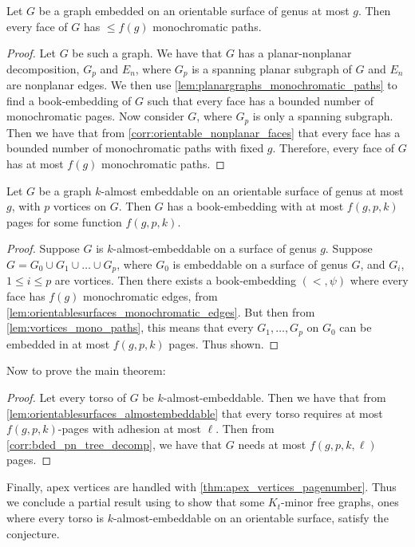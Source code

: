 \begin{lemma}\label{lem:orientablesurfaces_monochromatic_edges}
	Let $G$ be a graph embedded on an orientable surface of genus at most $g$. Then every face of $G$ has $ \leq f(g)$ monochromatic paths. 
\end{lemma}
\begin{proof}
	Let $G$ be such a graph. We have that $G$ has a planar-nonplanar decomposition, $G_p$ and $E_n$, where $G_p$ is a spanning planar subgraph of $G$ and $E_n$ are nonplanar edges. We then use \cref{lem:planargraphs_monochromatic_paths} to find a book-embedding of $G$ such that every face has a bounded number of monochromatic pages.
	Now consider $G$, where $G_p$ is only a spanning subgraph. Then we have that from \cref{corr:orientable_nonplanar_faces} that every face has a bounded number of monochromatic paths with fixed $g$. Therefore, every face of $G$ has at most $f(g)$ monochromatic paths.
\end{proof}
\begin{lemma}\label{lem:orientablesurfaces_almostembeddable}
	Let $G$ be a graph $k$-almost embeddable on an orientable surface of genus at most $g$, with $p$ vortices on $G$. Then $G$ has a book-embedding with at most $f(g, p, k)$ pages for some function $f(g, p, k)$. 
\end{lemma}

\begin{proof}
Suppose $G$ is $k$-almost-embeddable on a surface of genus $g$. Suppose $G = G_0 \cup G_1 \cup \ldots \cup G_p$, where $G_0$ is embeddable on a surface of genus $G$, and $G_i$, $1 \leq i \leq p$ are vortices. Then there exists a book-embedding $(<, \psi)$ where every face has $f(g)$ monochromatic edges, from \cref{lem:orientablesurfaces_monochromatic_edges}. But then from \cref{lem:vortices_mono_paths}, this means that every $G_1, \ldots, G_p$ on $G_0$ can be embedded in at most $f(g, p, k)$ pages. Thus shown.
\end{proof}

Now to prove the main theorem:
\begin{proof}
	Let every torso of $G$ be $k$-almost-embeddable. Then we have that from \cref{lem:orientablesurfaces_almostembeddable} that every torso requires at most $f(g, p, k)$-pages with adhesion at most $\ell$. Then from \cref{corr:bded_pn_tree_decomp}, we have that $G$ needs at most $f(g, p, k, \ell)$ pages. 
\end{proof}
Finally, apex vertices are handled with \cref{thm:apex_vertices_pagenumber}. Thus we conclude a partial result using \textcite{robertsonGraphMinorsXVI2003} to show that some $K_t$-minor free graphs, ones where every torso is $k$-almost-embeddable on an orientable surface, satisfy the conjecture. 
